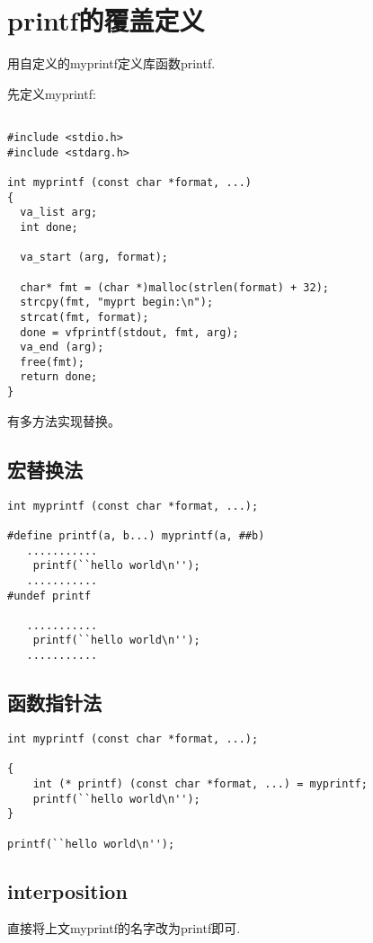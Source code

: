 \section{printf的覆盖定义}

用自定义的myprintf定义库函数printf.

先定义myprintf:
\begin{verbatim}

#include <stdio.h>
#include <stdarg.h>

int myprintf (const char *format, ...)
{
  va_list arg;
  int done;
        
  va_start (arg, format);

  char* fmt = (char *)malloc(strlen(format) + 32);
  strcpy(fmt, "myprt begin:\n");
  strcat(fmt, format);
  done = vfprintf(stdout, fmt, arg);
  va_end (arg);
  free(fmt);
  return done;
}

\end{verbatim}

有多方法实现替换。
\subsection{宏替换法}
\begin{verbatim}
int myprintf (const char *format, ...);

#define printf(a, b...) myprintf(a, ##b)
   ...........
    printf(``hello world\n'');
   ...........
#undef printf

   ...........
    printf(``hello world\n'');
   ...........
\end{verbatim}

\subsection{函数指针法}
\begin{verbatim}
int myprintf (const char *format, ...);

{
    int (* printf) (const char *format, ...) = myprintf;
    printf(``hello world\n'');
}

printf(``hello world\n'');
\end{verbatim}


\subsection{interposition}
直接将上文myprintf的名字改为printf即可.


